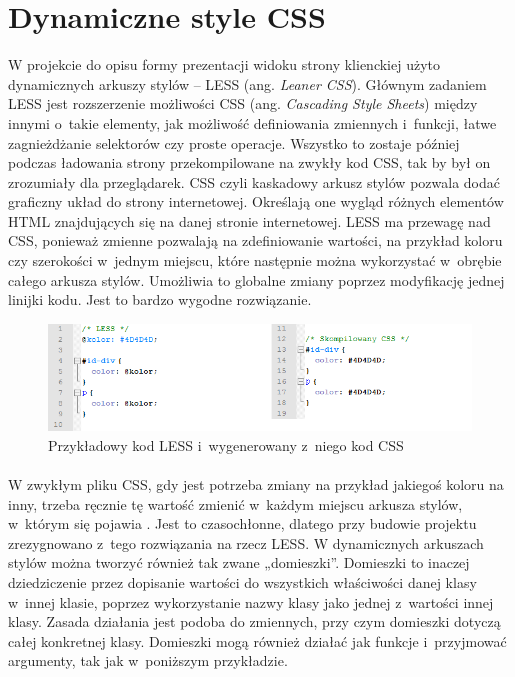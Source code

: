 \section{Dynamiczne style CSS}
W projekcie do opisu formy prezentacji widoku strony klienckiej użyto dynamicznych arkuszy stylów – LESS (ang. \textit{Leaner CSS}). Głównym zadaniem LESS jest rozszerzenie możliwości CSS (ang. \textit{Cascading Style Sheets}) między innymi o~takie elementy, jak możliwość definiowania zmiennych i~funkcji, łatwe zagnieżdżanie selektorów czy proste operacje. Wszystko to zostaje później podczas ładowania strony przekompilowane na zwykły kod CSS, tak by był on zrozumiały dla przeglądarek. CSS czyli kaskadowy arkusz stylów pozwala dodać graficzny układ do strony internetowej. Określają one wygląd różnych elementów HTML znajdujących się na danej stronie internetowej. 
LESS ma przewagę nad CSS, ponieważ zmienne pozwalają na zdefiniowanie wartości, na przykład koloru czy szerokości w~jednym miejscu, które następnie można wykorzystać w~obrębie całego arkusza stylów. Umożliwia to globalne zmiany poprzez modyfikację jednej linijki kodu. Jest to bardzo wygodne rozwiązanie. 

\begin{figure}[h]
	\centering
	\includegraphics[width=1.00\textwidth]{images/less1.png}
	\caption{Przykładowy kod LESS i~wygenerowany z~niego kod CSS}
\end{figure}
\paragraph{}
W zwykłym pliku CSS, gdy jest potrzeba zmiany na przykład jakiegoś koloru na inny, trzeba ręcznie tę wartość zmienić w~każdym miejscu arkusza stylów, w~którym się pojawia \cite{cssBook}. Jest to czasochłonne, dlatego przy budowie projektu zrezygnowano z~tego rozwiązania na rzecz LESS. 
W dynamicznych arkuszach stylów można tworzyć również tak zwane „domieszki”. Domieszki to inaczej dziedziczenie przez dopisanie wartości do wszystkich właściwości danej klasy w~innej klasie, poprzez wykorzystanie nazwy klasy jako jednej z~wartości innej klasy. Zasada działania jest podoba do zmiennych, przy czym domieszki dotyczą całej konkretnej klasy. Domieszki mogą również działać jak funkcje i~przyjmować argumenty, tak jak w~poniższym przykładzie.


